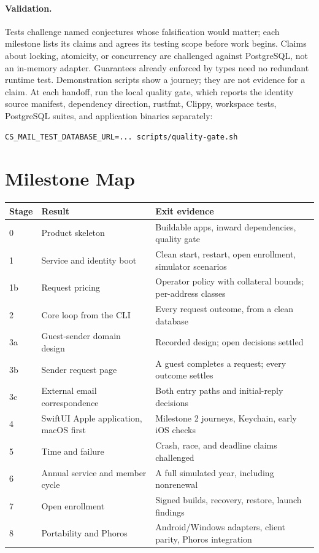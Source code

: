 \documentclass[11pt]{article}
\begin{document}
\paragraph{Validation.} Tests challenge named conjectures whose falsification
would matter; each milestone lists its claims and agrees its testing scope before
work begins. Claims about locking, atomicity, or concurrency are challenged
against PostgreSQL, not an in-memory adapter. Guarantees already enforced by types
need no redundant runtime test. Demonstration scripts show a journey; they are not
evidence for a claim. At each handoff, run the local quality gate, which reports
the identity source manifest, dependency direction, rustfmt, Clippy, workspace
tests, PostgreSQL suites, and application binaries separately:
\begin{lstlisting}
CS_MAIL_TEST_DATABASE_URL=... scripts/quality-gate.sh
\end{lstlisting}

\section{Milestone Map}

\begin{center}
\small
\begin{tabularx}{\textwidth}{@{}L{0.07\textwidth}L{0.33\textwidth}Y@{}}
\toprule
Stage & Result & Exit evidence \\
 & Product skeleton & Buildable apps, inward dependencies, quality gate \\
1 & Service and identity boot & Clean start, restart, open enrollment, simulator scenarios \\
1b & Request pricing & Operator policy with collateral bounds; per-address classes \\
2 & Core loop from the CLI & Every request outcome, from a clean database \\
3a & Guest-sender domain design & Recorded design; open decisions settled \\
3b & Sender request page & A guest completes a request; every outcome settles \\
3c & External email correspondence & Both entry paths and initial-reply decisions \\
4 & SwiftUI Apple application, macOS first & Milestone 2 journeys, Keychain, early iOS checks \\
5 & Time and failure & Crash, race, and deadline claims challenged \\
6 & Annual service and member cycle & A full simulated year, including nonrenewal \\
7 & Open enrollment & Signed builds, recovery, restore, launch findings \\
8 & Portability and Phoros & Android/Windows adapters, client parity, Phoros integration \\
\bottomrule
\end{tabularx}
\end{center}
\end{document}
